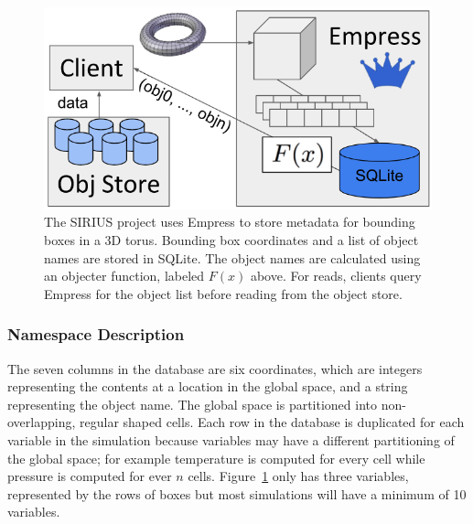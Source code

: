 
\begin{figure}[tb]
\centering
  \includegraphics[width=1\linewidth]{figures/empress.png}
  \caption{The SIRIUS project uses Empress to store metadata for bounding boxes
in a 3D torus. Bounding box coordinates and a list of object names are stored
in SQLite. The object names are calculated using an objecter function, labeled
\(F(x)\) above. For reads, clients query Empress for the object list before
reading from the object store.}
  \label{fig:empress}
\end{figure}

\subsubsection{Namespace Description}

The seven columns in the database are six coordinates, which are integers
representing the contents at a location in the global space, and a string
representing the object name. The global space is partitioned into
non-overlapping, regular shaped cells.  Each row in the database is duplicated
for each variable in the simulation because variables may have a different
partitioning of the global space; for example temperature is computed for every
cell while pressure is computed for ever \(n\) cells.  Figure~\ref{fig:empress}
only has three variables, represented by the rows of boxes but most simulations
will have a minimum of 10 variables.

